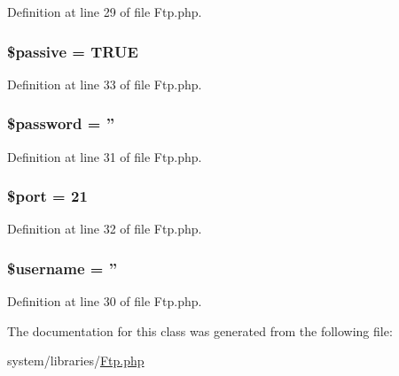 Definition at line 29 of file Ftp.\-php.

\hypertarget{class_c_i___f_t_p_a9fb61732ea9189fa2be5574ad3576d9c}{
\subsubsection[{\$passive}]{\setlength{\rightskip}{0pt plus 5cm}\$passive = T\-R\-U\-E}}\label{class_c_i___f_t_p_a9fb61732ea9189fa2be5574ad3576d9c}


Definition at line 33 of file Ftp.\-php.

\hypertarget{class_c_i___f_t_p_a607686ef9f99ea7c42f4f3dd3dbb2b0d}{
\subsubsection[{\$password}]{\setlength{\rightskip}{0pt plus 5cm}\$password = ''}}\label{class_c_i___f_t_p_a607686ef9f99ea7c42f4f3dd3dbb2b0d}


Definition at line 31 of file Ftp.\-php.

\hypertarget{class_c_i___f_t_p_aa0787efab4b22e8a212882f3409d4c77}{
\subsubsection[{\$port}]{\setlength{\rightskip}{0pt plus 5cm}\$port = 21}}\label{class_c_i___f_t_p_aa0787efab4b22e8a212882f3409d4c77}


Definition at line 32 of file Ftp.\-php.

\hypertarget{class_c_i___f_t_p_a0eb82aa5f81cf845de4b36cd653c42cf}{
\subsubsection[{\$username}]{\setlength{\rightskip}{0pt plus 5cm}\$username = ''}}\label{class_c_i___f_t_p_a0eb82aa5f81cf845de4b36cd653c42cf}


Definition at line 30 of file Ftp.\-php.



The documentation for this class was generated from the following file\-:\begin{DoxyCompactItemize}
\item 
system/libraries/\hyperlink{_ftp_8php}{Ftp.\-php}\end{DoxyCompactItemize}
